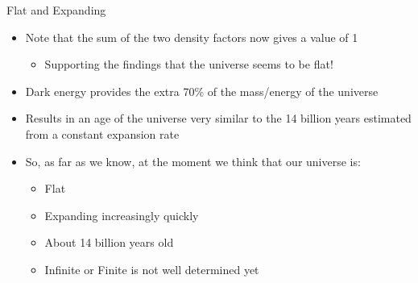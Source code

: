 \documentclass[pdf,aspectratio=169]{beamer}
\begin{document}

\begin{frame}{Flat and Expanding}
  \begin{itemize}
	\item Note that the sum of the two density factors now gives a value of 1
	  \begin{itemize}
		\item Supporting the findings that the universe seems to be flat!
	  \end{itemize}
	\item Dark energy provides the extra 70\% of the mass/energy of the universe
	\item Results in an age of the universe very similar to the 14 billion years estimated from a constant expansion rate
	\item So, as far as we know, at the moment we think that our universe is:
	  \begin{itemize}
		\item Flat
		\item Expanding increasingly quickly
		\item About 14 billion years old
		\item Infinite or Finite is not well determined yet
	  \end{itemize}
  \end{itemize}
\end{frame}
\end{document}

